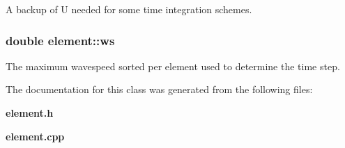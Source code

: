 A backup of U needed for some time integration schemes. 

\subsubsection[{ws}]{\setlength{\rightskip}{0pt plus 5cm}double element\-::ws}\label{classelement_a9b99359b392c0e02a7706cd447f8b82d}


The maximum wavespeed sorted per element used to determine the time step. 



The documentation for this class was generated from the following files\-:\begin{DoxyCompactItemize}
\item 
{\bf element.\-h}\item 
{\bf element.\-cpp}\end{DoxyCompactItemize}
